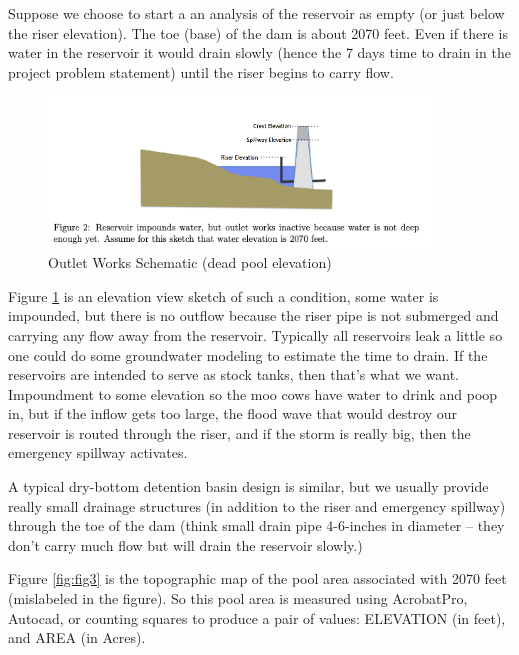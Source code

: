 \documentclass[12pt]{article}
\begin{document}
Suppose we choose to start a an analysis of the reservoir as empty (or just below the riser elevation). The toe (base) of the dam is about 2070 feet. Even if there is water in the reservoir it would drain slowly (hence the 7 days time to drain in the project problem statement) until the riser begins to carry flow.

\begin{figure}[h!] %
   \centering
   \includegraphics[width=4.0in]{fig2.png} 
   \caption{Outlet Works Schematic (dead pool elevation)}
   \label{fig:fig2}
\end{figure}

Figure \ref{fig:fig2} is an elevation view sketch of such a condition, some water is impounded, but there is no outflow because the riser pipe is not submerged and carrying any flow away from the reservoir. Typically all reservoirs leak a little so one could do some groundwater modeling to estimate the time to drain. If the reservoirs are intended to serve as stock tanks, then that’s what we want. Impoundment to some elevation so the moo cows have water to drink and poop in, but if the inflow gets too large, the flood wave that would destroy our reservoir is routed through the riser, and if the storm is really big, then the emergency spillway activates.

A typical dry-bottom detention basin design is similar, but we usually provide really small drainage structures (in addition to the riser and emergency spillway) through the toe of the dam (think small drain pipe 4-6-inches in diameter – they don’t carry much flow but will drain the reservoir slowly.)

Figure \ref{fig:fig3} is the topographic map of the pool area associated with 2070 feet (mislabeled in the figure). So this pool area is measured using AcrobatPro, Autocad, or counting squares to produce a pair of values: ELEVATION (in feet), and AREA (in Acres).
\end{document}
